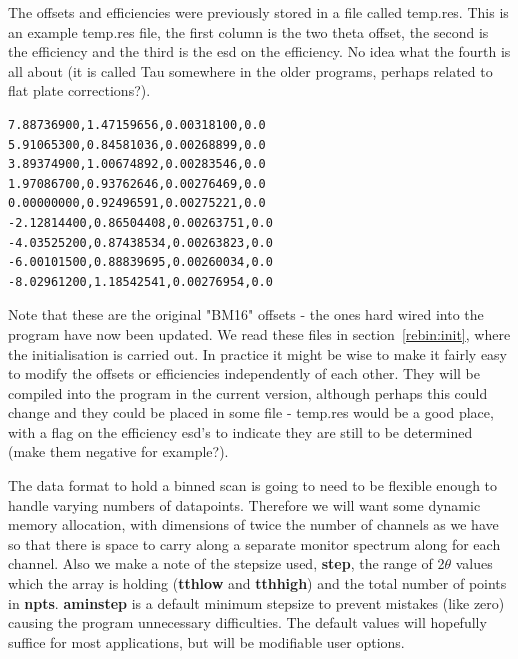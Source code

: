 \documentclass[10pt,a4paper,notitlepage]{article}
\newcommand{\var}[1]{\textbf{\textsf{#1}}} %
\begin{document}
The offsets and efficiencies were previously stored in a file
called temp.res. This is an example temp.res file, the first column
is the two theta offset, the second is the efficiency and the third
is the esd on the efficiency. No idea what the fourth is all about (it
is called Tau somewhere in the older programs, perhaps related to
flat plate corrections?).

\begin{verbatim}
7.88736900,1.47159656,0.00318100,0.0
5.91065300,0.84581036,0.00268899,0.0
3.89374900,1.00674892,0.00283546,0.0
1.97086700,0.93762646,0.00276469,0.0
0.00000000,0.92496591,0.00275221,0.0
-2.12814400,0.86504408,0.00263751,0.0
-4.03525200,0.87438534,0.00263823,0.0
-6.00101500,0.88839695,0.00260034,0.0
-8.02961200,1.18542541,0.00276954,0.0
\end{verbatim}

Note that these are the original "BM16" offsets - the ones hard wired into 
the program have now been updated.
We read these files in section~\ref{rebin:init}, where the initialisation
is carried out. In practice it might be wise to make it fairly
easy to modify the offsets or efficiencies independently of each other.
They will be compiled into the program in the current version, although
perhaps this could change and they could be placed in some file - temp.res
would be a good place, with a flag on the efficiency esd's to indicate they
are still to be determined (make them negative for example?).

The data format to hold a binned scan is going to need to be
flexible enough to handle varying numbers of datapoints. 
Therefore we will want some dynamic memory allocation, with dimensions of twice
the number of channels as we have so that there is space to carry along
a separate monitor spectrum along for each channel.
Also we make a note of the stepsize used, \var{step}, the range of 2$\theta$
values which the array is holding (\var{tthlow} and \var{tthhigh})
and the total number of points in \var{npts}. 
\var{aminstep} is a default minimum stepsize to prevent mistakes (like zero)
causing the program unnecessary difficulties.
The default values will hopefully
suffice for most applications, but will be modifiable user options.
\end{document}
